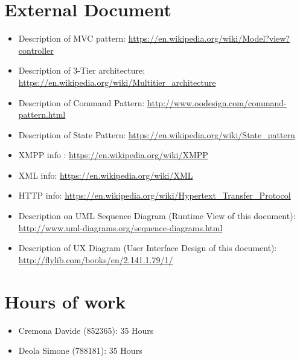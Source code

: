 \documentclass[../../dd.tex]{subfiles}
\begin{document}
		\section{External Document}
		\begin{itemize}
		\item Description of MVC pattern: \url{https://en.wikipedia.org/wiki/Model?view?controller}
		
		\item Description of 3-Tier architecture: \url{https://en.wikipedia.org/wiki/Multitier_architecture}
		
		\item Description of Command Pattern: \url{http://www.oodesign.com/command-pattern.html}
		
		\item Description of State Pattern: \url{https://en.wikipedia.org/wiki/State_pattern}
		
		\item XMPP info : \url{https://en.wikipedia.org/wiki/XMPP}		
		
		\item XML info: \url{https://en.wikipedia.org/wiki/XML}
		
		\item HTTP info: \url{https://en.wikipedia.org/wiki/Hypertext_Transfer_Protocol}
				
		\item Description on UML Sequence Diagram (Runtime View of this document): \url{http://www.uml-diagrams.org/sequence-diagrams.html}		
		\item Description of UX Diagram (User Interface Design of this document): \url{http://flylib.com/books/en/2.141.1.79/1/}
		
				\end{itemize}
		
		\section{Hours of work}
		
		\begin{itemize}
		\item Cremona Davide (852365): 35 Hours
		\item Deola Simone (788181): 35 Hours
		\end{itemize}
\end{document}

